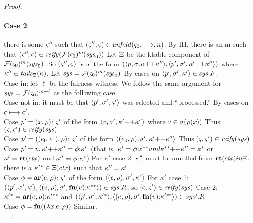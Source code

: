 \begin{proof}
\paragraph{Case 2:} there is some $\varsigma''$ such that $(\varsigma'',\varsigma) \in \mathit{unfold}(\varsigma_0,\longmapsto,n)$.
        By IH, there is an m such that $(\varsigma'',\varsigma) \in \mathit{reify}({\mathcal F}(\varsigma_0)^m(\mathit{sys}_0))$
        Let $\Xi$ be the ktable component of ${\mathcal F}(\varsigma_0)^m(\mathit{sys}_0)$.
        So $(\varsigma'',\varsigma)$ is of the form $(\langle p, \sigma, \kappa {\tt ++} \kappa'' \rangle,\langle p',\sigma',\kappa' {\tt ++} \kappa'' \rangle)$ where $\kappa'' \in \mathit{tails}_{\Xi}(\kappa)$.
   Let $\mathit{sys} = {\mathcal F}(\varsigma_0)^m(\mathit{sys}_0)$
   By cases on $\langle p',\sigma',\kappa' \rangle \in \mathit{sys}.F$.
\\
    Case in: let $\ell$ be the fairness witness. We follow the same argument for $\mathit{sys}={\mathcal F}(\varsigma_0)^{m+\ell}$ as
              the following case.
\\
    Case not in: it must be that $\langle p',\sigma',\kappa' \rangle$ was selected and ``processed.''
                 By cases on $\varsigma \longmapsto \varsigma'$.
\\
        Case $p'=(x,\rho)$:
        $\varsigma'$ of the form $\langle v,\sigma',\kappa' {\tt ++} \kappa'' \rangle$ where $v \in \sigma(\rho(x))$
         Thus $(\varsigma,\varsigma') \in \mathit{reify}(\mathit{sys})$
\\
        Case $p'=((e_{0}\ e_{1}),\rho)$:
        $\varsigma'$ of the form $\langle (e_{0},\rho),\sigma',\kappa' {\tt ++} \kappa'' \rangle$
         Thus $(\varsigma,\varsigma') \in \mathit{reify}(\mathit{sys})$
\\
        Case $p'=v, \kappa' {\tt ++} \kappa''=\phi{\tt :} \kappa^*$ (that is, $\kappa' = \phi{\tt :} \kappa^{**} and \kappa^{**} {\tt ++} \kappa''=\kappa^*$ or $\kappa'=\mathbf{rt}(\mathit{ctx})$ and $\kappa''=\phi{\tt :} \kappa^*$)
         For $\kappa'$ case 2: $\kappa''$ must be unrolled from $\mathbf{rt}(\mathit{ctx}) in \Xi$.
                         there is a $\kappa'{}^* \in \Xi(\mathit{ctx})$ such that $\kappa'' = \kappa'$
\\
         Case $\phi=\mathbf{ar}{}(e,\rho)$:
          $\varsigma'$ of the form  $\langle (e,\rho),\sigma',\kappa^* \rangle$
          For $\kappa'$ case 1: $(\langle p',\sigma',\kappa' \rangle, \langle (e,\rho),\sigma',\mathbf{fn}{}(v){\tt :} \kappa^{**} \rangle) \in \mathit{sys}.R$, so $(\varsigma,\varsigma') \in \mathit{reify}(\mathit{sys})$
          Case 2: $\kappa'{}^* = \mathbf{ar}{}(e,\rho){\tt :} \kappa'{}^{**}$ and
          $(\langle p',\sigma',\kappa'{}^* \rangle,\langle (e,\rho),\sigma',\mathbf{fn}{}(v){\tt :} \kappa'{}^{**} \rangle) \in sys'.R$
\\
         Case $\phi=\mathbf{fn}{}((\lambda{} x. e, \rho))$
          Similar.
\\


\end{proof}
